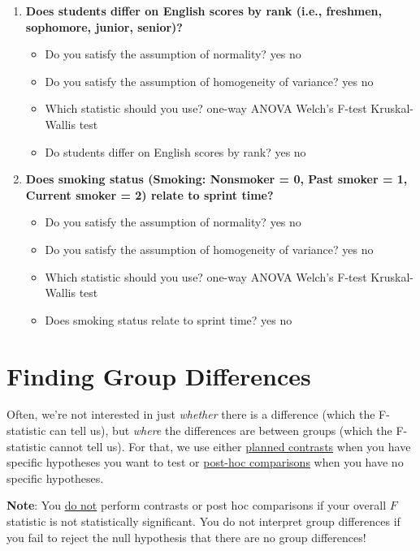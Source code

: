 \documentclass[
]{book}
\begin{document}
\begin{enumerate}
\def\labelenumi{\arabic{enumi}.}
\item
  \textbf{Does students differ on English scores by rank (i.e., freshmen, sophomore, junior, senior)?}

  \begin{itemize}
  \item
    Do you satisfy the assumption of normality? yes no
  \item
    Do you satisfy the assumption of homogeneity of variance? yes no
  \item
    Which statistic should you use? one-way ANOVA Welch's F-test Kruskal-Wallis test
  \item
    Do students differ on English scores by rank? yes no
  \end{itemize}
\item
  \textbf{Does smoking status (Smoking: Nonsmoker = 0, Past smoker = 1, Current smoker = 2) relate to sprint time?}

  \begin{itemize}
  \item
    Do you satisfy the assumption of normality? yes no
  \item
    Do you satisfy the assumption of homogeneity of variance? yes no
  \item
    Which statistic should you use? one-way ANOVA Welch's F-test Kruskal-Wallis test
  \item
    Does smoking status relate to sprint time? yes no
  \end{itemize}
\end{enumerate}

\hypertarget{finding-group-differences}{%
\section{Finding Group Differences}\label{finding-group-differences}}

Often, we're not interested in just \emph{whether} there is a difference (which the F-statistic can tell us), but \emph{where} the differences are between groups (which the F-statistic cannot tell us). For that, we use either \underline{planned contrasts} when you have specific hypotheses you want to test or \underline{post-hoc comparisons} when you have no specific hypotheses.

\textbf{Note}: You \underline{do not} perform contrasts or post hoc comparisons if your overall \(F\) statistic is not statistically significant. You do not interpret group differences if you fail to reject the null hypothesis that there are no group differences!
\end{document}
